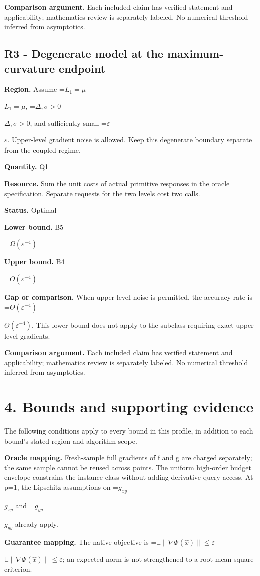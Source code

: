 \documentclass[10pt,a4paper]{article}
\newcommand{\AtlasMath}[1]{\par\begingroup\centering\setbox0=\hbox{$\displaystyle #1$}\ifdim\wd0>1.4\linewidth\typeout{ATLAS WIDE FORMULA: \the\wd0}\fi\ifdim\wd0>\linewidth\resizebox{\linewidth}{!}{\box0}\else\box0\fi\par\endgroup}
\newcommand{\AtlasInlineMath}[1]{\begingroup\setbox0=\hbox{$#1$}\ifdim\wd0>.4\linewidth\endgroup\AtlasMath{#1}\else\endgroup$#1$\fi}
\begin{document}
\textbf{Comparison argument.} Each included claim has verified statement and applicability; mathematics review is separately labeled. No numerical threshold inferred from asymptotics.

\subsection{R3 - Degenerate model at the maximum-curvature endpoint}
\textbf{Region.} Assume \AtlasInlineMath{L_1=\mu}, \AtlasInlineMath{\Delta,\sigma>0}, and sufficiently small \AtlasInlineMath{\varepsilon}. Upper-level gradient noise is allowed. Keep this degenerate boundary separate from the coupled regime.

\textbf{Quantity.} Q1

\textbf{Resource.} Sum the unit costs of actual primitive responses in the oracle specification. Separate requests for the two levels cost two calls.

\textbf{Status.} Optimal

\textbf{Lower bound.} B5

\AtlasMath{\Omega (\varepsilon ^{-4})}
\textbf{Upper bound.} B4

\AtlasMath{O(\varepsilon ^{-4})}
\textbf{Gap or comparison.} When upper-level noise is permitted, the accuracy rate is \AtlasInlineMath{\Theta(\varepsilon^{-4})}. This lower bound does not apply to the subclass requiring exact upper-level gradients.

\textbf{Comparison argument.} Each included claim has verified statement and applicability; mathematics review is separately labeled. No numerical threshold inferred from asymptotics.

\section{4. Bounds and supporting evidence}
The following conditions apply to every bound in this profile, in addition to each bound's stated region and algorithm scope.

\textbf{Oracle mapping.} Fresh-sample full gradients of f and g are charged separately; the same sample cannot be reused across points. The uniform high-order budget envelope constrains the instance class without adding derivative-query access. At p=1, the Lipschitz assumptions on \AtlasInlineMath{g_{xy}} and \AtlasInlineMath{g_{yy}} already apply.

\textbf{Guarantee mapping.} The native objective is \AtlasInlineMath{\mathbb E\|\nabla\Phi(\widehat x)\|\le\varepsilon}; an expected norm is not strengthened to a root-mean-square criterion.
\end{document}
